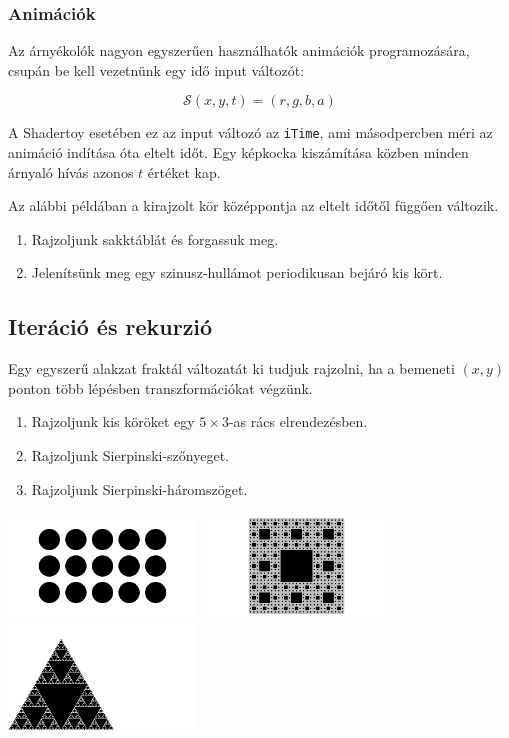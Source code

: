 \subsubsection{Animációk}
Az árnyékolók nagyon egyszerűen használhatók animációk programozására, csupán
be kell vezetnünk egy idő input változót:

$$\mathcal{S}(x, y, t) = (r, g, b, a)$$

A Shadertoy esetében ez az input változó az \texttt{iTime}, ami másodpercben méri az animáció indítása
óta eltelt időt. Egy képkocka kiszámítása közben minden árnyaló hívás azonos $t$ értéket kap.

Az alábbi példában a kirajzolt kör középpontja
az eltelt időtől függően változik.


\progfeladatok

\begin{enumerate}
  \item Rajzoljunk sakktáblát és forgassuk meg.
  \item Jelenítsünk meg egy szinusz-hullámot periodikusan bejáró kis kört.
\end{enumerate}

\subsection{Iteráció és rekurzió}

Egy egyszerű alakzat fraktál változatát ki tudjuk rajzolni, ha a bemeneti $(x,y)$
ponton több lépésben transzformációkat végzünk.

\progfeladatok
\begin{enumerate}
  \item Rajzoljunk kis köröket egy $5\times 3$-as rács elrendezésben.
  \item Rajzoljunk Sierpinski-szőnyeget.
  \item Rajzoljunk Sierpinski-háromszöget.
\end{enumerate}

\includegraphics[width=5cm]{images/iter01.png}
\includegraphics[width=5cm]{images/sier4.png}
\includegraphics[width=5cm]{images/sier3.png}



